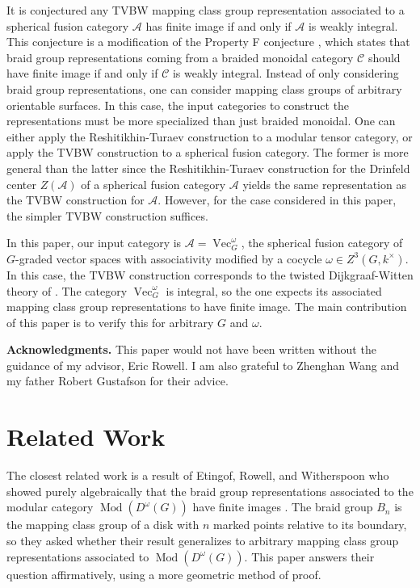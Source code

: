 \documentclass{ws-jktr}
\DeclareMathOperator{\Mod}{Mod}
\DeclareMathOperator{\Vect}{Vec}
\begin{document}
It is conjectured any TVBW mapping class group representation associated to a spherical fusion category $\mathcal A$ has finite image if and only if  $\mathcal A$ is weakly integral.  This conjecture is a modification of the Property F conjecture \cite{nr, erw}, which states that braid group representations coming from a braided monoidal category $\mathcal C$ should have finite image if and only if $\mathcal C$ is weakly integral. Instead of only considering braid group representations, one can consider mapping class groups of arbitrary orientable surfaces.  In this case, the input categories to construct the representations must be more specialized than just braided monoidal.  One can either apply the Reshitikhin-Turaev construction to a modular tensor category, or apply the TVBW construction to a spherical fusion category.  The former is more general than the latter since the Reshitikhin-Turaev construction for the Drinfeld center $Z(\mathcal A)$ of a spherical fusion category $\mathcal A$ yields the same representation as the TVBW construction for $\mathcal A$.  However, for the case considered in this paper, the simpler TVBW construction suffices.

In this paper, our input category is  $\mathcal A = \Vect_G^\omega$, the spherical fusion category of $G$-graded vector spaces with associativity modified by a cocycle $\omega \in Z^3(G, k^\times)$.  In this case, the TVBW construction corresponds to the twisted Dijkgraaf-Witten theory of \cite{dijkgraaf1990}.  The category $\Vect_G^\omega$ is integral, so the one expects its associated mapping class group representations to have finite image.  The main contribution of this paper is to verify this for arbitrary $G$ and $\omega$.

\textbf{Acknowledgments.}  This paper would not have been written without the guidance of my advisor, Eric Rowell.  I am also grateful to Zhenghan Wang and my father Robert Gustafson for their advice.

\section{Related Work}

The closest related work is a result of Etingof, Rowell, and Witherspoon who showed purely algebraically that the braid group representations associated to the modular category $\Mod(D^\omega(G))$ have finite images \cite{erw}.   The braid group $B_n$ is the mapping class group of a disk with $n$ marked points relative to its boundary, so they asked whether their result generalizes to arbitrary mapping class group representations associated to $\Mod(D^\omega(G))$. This paper answers their question affirmatively, using a more geometric method of proof.
\end{document}
